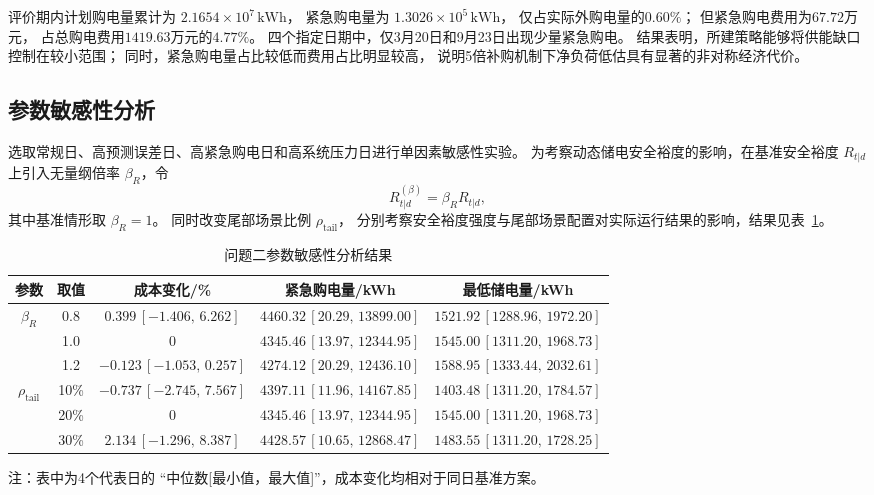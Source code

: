 \documentclass[zihao=-4,a4paper,UTF8,fontset=none]{ctexart}
\begin{document}
评价期内计划购电量累计为
$2.1654\times10^7\,\mathrm{kWh}$，
紧急购电量为
$1.3026\times10^5\,\mathrm{kWh}$，
仅占实际外购电量的$0.60\%$；
但紧急购电费用为$67.72$万元，
占总购电费用$1419.63$万元的$4.77\%$。
四个指定日期中，仅3月20日和9月23日出现少量紧急购电。
结果表明，所建策略能够将供能缺口控制在较小范围；
同时，紧急购电量占比较低而费用占比明显较高，
说明5倍补购机制下净负荷低估具有显著的非对称经济代价。
\subsection{参数敏感性分析}

选取常规日、高预测误差日、高紧急购电日和高系统压力日进行单因素敏感性实验。
为考察动态储电安全裕度的影响，在基准安全裕度 $R_{t|d}$ 上引入无量纲倍率
$\beta_R$，令
\[
    R_{t|d}^{(\beta)}
    =
    \beta_R R_{t|d},
\]
其中基准情形取 $\beta_R=1$。
同时改变尾部场景比例 $\rho_{\mathrm{tail}}$，
分别考察安全裕度强度与尾部场景配置对实际运行结果的影响，结果见表~\ref{tab:q2_sensitivity}。

\begin{table}[H]
    \centering
    \caption{问题二参数敏感性分析结果}
    \label{tab:q2_sensitivity}
    \scriptsize
    \setlength{\tabcolsep}{4.0pt}
    \renewcommand{\arraystretch}{0.92}
    \begin{tabular}{ccccc}
        \toprule
        参数 & 取值
        & 成本变化/\%
        & 紧急购电量/kWh
        & 最低储电量/kWh \\
        \midrule

        \multirow{3}{*}{$\beta_R$}
        & 0.8
        & $0.399\,[-1.406,\,6.262]$
        & $4460.32\,[20.29,\,13899.00]$
        & $1521.92\,[1288.96,\,1972.20]$ \\

        & 1.0
        & $0$
        & $4345.46\,[13.97,\,12344.95]$
        & $1545.00\,[1311.20,\,1968.73]$ \\

        & 1.2
        & $-0.123\,[-1.053,\,0.257]$
        & $4274.12\,[20.29,\,12436.10]$
        & $1588.95\,[1333.44,\,2032.61]$ \\

        \midrule

        \multirow{3}{*}{$\rho_{\mathrm{tail}}$}
        & 10\%
        & $-0.737\,[-2.745,\,7.567]$
        & $4397.11\,[11.96,\,14167.85]$
        & $1403.48\,[1311.20,\,1784.57]$ \\

        & 20\%
        & $0$
        & $4345.46\,[13.97,\,12344.95]$
        & $1545.00\,[1311.20,\,1968.73]$ \\

        & 30\%
        & $2.134\,[-1.296,\,8.387]$
        & $4428.57\,[10.65,\,12868.47]$
        & $1483.55\,[1311.20,\,1728.25]$ \\

        \bottomrule
    \end{tabular}

    {\scriptsize 注：表中为4个代表日的
    “中位数[最小值，最大值]”，成本变化均相对于同日基准方案。}
\end{table}
\end{document}
